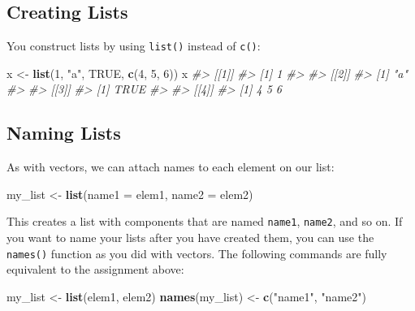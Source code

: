\documentclass[]{book}
\newenvironment{Shaded}{\begin{snugshade}}{\end{snugshade}}
\newcommand{\KeywordTok}[1]{\textcolor[rgb]{0.13,0.29,0.53}{\textbf{#1}}}
\newcommand{\DataTypeTok}[1]{\textcolor[rgb]{0.13,0.29,0.53}{#1}}
\newcommand{\DecValTok}[1]{\textcolor[rgb]{0.00,0.00,0.81}{#1}}
\newcommand{\StringTok}[1]{\textcolor[rgb]{0.31,0.60,0.02}{#1}}
\newcommand{\CommentTok}[1]{\textcolor[rgb]{0.56,0.35,0.01}{\textit{#1}}}
\newcommand{\OtherTok}[1]{\textcolor[rgb]{0.56,0.35,0.01}{#1}}
\newcommand{\NormalTok}[1]{#1}
\begin{document}
\subsection{Creating Lists}\label{creating-lists}

You construct lists by using \texttt{list()} instead of \texttt{c()}:

\begin{Shaded}
\begin{Highlighting}[]
\NormalTok{x <-}\StringTok{ }\KeywordTok{list}\NormalTok{(}\DecValTok{1}\NormalTok{, }\StringTok{"a"}\NormalTok{, }\OtherTok{TRUE}\NormalTok{, }\KeywordTok{c}\NormalTok{(}\DecValTok{4}\NormalTok{, }\DecValTok{5}\NormalTok{, }\DecValTok{6}\NormalTok{))}
\NormalTok{x}
\CommentTok{#> [[1]]}
\CommentTok{#> [1] 1}
\CommentTok{#> }
\CommentTok{#> [[2]]}
\CommentTok{#> [1] "a"}
\CommentTok{#> }
\CommentTok{#> [[3]]}
\CommentTok{#> [1] TRUE}
\CommentTok{#> }
\CommentTok{#> [[4]]}
\CommentTok{#> [1] 4 5 6}
\end{Highlighting}
\end{Shaded}

\subsection{Naming Lists}\label{naming-lists}

As with vectors, we can attach names to each element on our list:

\begin{Shaded}
\begin{Highlighting}[]
\NormalTok{my_list <-}\StringTok{ }\KeywordTok{list}\NormalTok{(}\DataTypeTok{name1 =}\NormalTok{ elem1, }
                \DataTypeTok{name2 =}\NormalTok{ elem2)}
\end{Highlighting}
\end{Shaded}

This creates a list with components that are named \texttt{name1},
\texttt{name2}, and so on. If you want to name your lists after you have
created them, you can use the \texttt{names()} function as you did with
vectors. The following commands are fully equivalent to the assignment
above:

\begin{Shaded}
\begin{Highlighting}[]
\NormalTok{my_list <-}\StringTok{ }\KeywordTok{list}\NormalTok{(elem1, elem2)}
\KeywordTok{names}\NormalTok{(my_list) <-}\StringTok{ }\KeywordTok{c}\NormalTok{(}\StringTok{"name1"}\NormalTok{, }\StringTok{"name2"}\NormalTok{)}
\end{Highlighting}
\end{Shaded}
\end{document}
